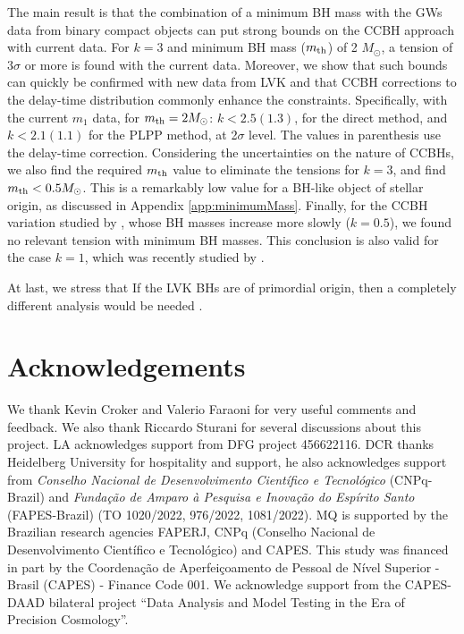 \documentclass[fleqn,usenatbib,useAMS]{mnras}
\begin{document}
The main result is that the combination of a minimum BH mass with the GWs data from binary compact objects can put strong bounds on the CCBH approach with current data. For $k=3$ and minimum BH mass ($m_{\rm th}$) of 2 $M_\odot$, a tension of $3 \sigma$ or more is found with the current data.  Moreover, we show that such bounds can {quickly be confirmed} with new data from LVK and that CCBH corrections to the delay-time distribution commonly enhance the constraints. Specifically, with the current $m_1$ data, for  $m_{\rm th} = 2 M_\odot$: $k< 2.5 (1.3)$, for the direct method, and $k < 2.1 (1.1)$  for the PLPP method, at 2$\sigma$ level. The values in parenthesis use the \citet{Ghodla:2023iaz} delay-time correction. Considering the uncertainties on the nature of CCBHs, we also find the required $m_{\rm th}$  value to eliminate the tensions for $k=3$, and find $m_{\rm th} < 0.5 M_\odot$. This is a remarkably low value for a BH-like object of stellar origin, as discussed in Appendix \ref{app:minimumMass}.
Finally, for the CCBH variation studied by \citet{Croker:2021duf}, whose BH masses increase more slowly ($k=0.5$), we found no relevant tension with minimum BH masses. This conclusion is also valid for the case $k=1$, which was recently studied by \citet{Cadoni:2023lum, Cadoni:2023lqe}. 

At last, we stress that If the LVK BHs are of primordial origin, then a completely different analysis would be needed \citep[see also][]{Ghodla:2023iaz}.

\section*{Acknowledgements}
We thank Kevin Croker and Valerio Faraoni for very useful comments and feedback. We also thank Riccardo Sturani for several discussions about this project. LA acknowledges support from DFG project  456622116. 
DCR thanks Heidelberg University for hospitality and support, he also acknowledges support from \textit{Conselho Nacional de Desenvolvimento Científico e Tecnológico} (CNPq-Brazil) and \textit{Fundação de Amparo à Pesquisa e Inovação do Espírito Santo} (FAPES-Brazil) (TO 1020/2022, 976/2022, 1081/2022).
MQ is supported by the Brazilian research agencies FAPERJ, CNPq (Conselho Nacional de Desenvolvimento Científico e Tecnológico) and CAPES. This study was financed in part by the Coordenação de Aperfeiçoamento de Pessoal de Nível Superior - Brasil (CAPES) - Finance Code 001. We acknowledge support from the CAPES-DAAD bilateral project  ``Data Analysis and Model Testing in the Era of Precision Cosmology''.
\end{document}
